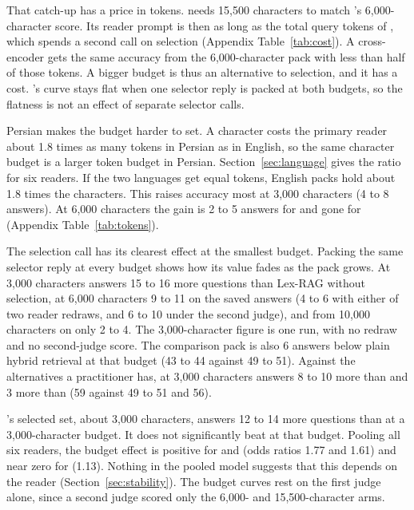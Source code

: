 That catch-up has a price in tokens. \hybrid{} needs 15,500 characters to match \lexb's 6,000-character score. Its reader prompt is then as long as the total query tokens of \lexb, which spends a second call on selection (Appendix Table~\ref{tab:cost}). A cross-encoder gets the same accuracy from the 6,000-character pack with less than half of those tokens. A bigger budget is thus an alternative to selection, and it has a cost. \lexb's curve stays flat when one selector reply is packed at both budgets, so the flatness is not an effect of separate selector calls.

Persian makes the budget harder to set. A character costs the primary reader about 1.8 times as many tokens in Persian as in English, so the same character budget is a larger token budget in Persian. Section~\ref{sec:language} gives the ratio for six readers. If the two languages get equal tokens, English packs hold about 1.8 times the characters. This raises accuracy most at 3,000 characters (4 to 8 answers). At 6,000 characters the gain is 2 to 5 answers for \hybrid{} and gone for \hr{} (Appendix Table~\ref{tab:tokens}).

The selection call has its clearest effect at the smallest budget. Packing the same selector reply at every budget shows how its value fades as the pack grows. At 3,000 characters \lexb{} answers 15 to 16 more questions than Lex-RAG without selection, at 6,000 characters 9 to 11 on the saved answers (4 to 6 with either of two reader redraws, and 6 to 10 under the second judge), and from 10,000 characters on only 2 to 4. The 3,000-character figure is one run, with no redraw and no second-judge score. The comparison pack is also 6 answers below plain hybrid retrieval at that budget (43 to 44 against 49 to 51). Against the alternatives a practitioner has, \lexb{} at 3,000 characters answers 8 to 10 more than \hybrid{} and 3 more than \hr{} (59 against 49 to 51 and 56).

\setr's selected set, about 3,000 characters, answers 12 to 14 more questions than \hybrid{} at a 3,000-character budget. It does not significantly beat \hr{} at that budget. Pooling all six readers, the budget effect is positive for \hybrid{} and \hr{} (odds ratios 1.77 and 1.61) and near zero for \lexb{} (1.13). Nothing in the pooled model suggests that this depends on the reader (Section~\ref{sec:stability}). The budget curves rest on the first judge alone, since a second judge scored only the 6,000- and 15,500-character arms.
